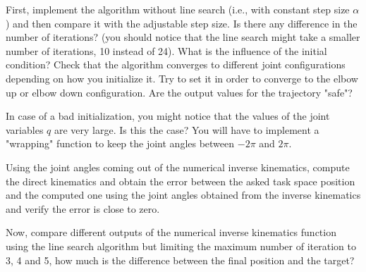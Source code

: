 \documentclass[11pt]{article}
\begin{document}
First, implement the algorithm without line search (i.e., with constant step size $\alpha$) and then compare it with the adjustable step size. Is there any difference in the number of iterations?  (you should notice that the line search might take a smaller number of iterations, 10 instead of 24). What is the influence of the initial condition? 
Check that the algorithm converges to different joint configurations depending on how you initialize it. Try to set it in order to converge to the elbow up or elbow down configuration.  Are the output values for the trajectory "safe"? 

In case of a bad initialization, you might notice that the values of the joint variables $q$ are very large. Is this the case? You will have to implement a "wrapping" function to keep the joint angles between $-2\pi$ and $2\pi$. 
 
Using the joint angles coming out of the numerical inverse kinematics, compute the direct kinematics and obtain the error between the asked task space position and the computed one using the joint angles obtained from the inverse kinematics and verify the error is close to zero.  
 
Now,  compare different outputs of the numerical inverse kinematics function  using the line search algorithm but limiting the maximum number of iteration to 3, 4 and 5, how much is the difference between the final position and the target? 

\end{document}
